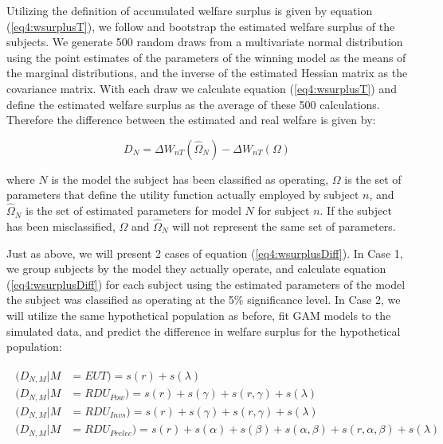 \documentclass[../main.tex]{subfiles}
\begin{document}
Utilizing the definition of accumulated welfare surplus is given by equation (\ref{eq4:wsurplusT}), we follow \textcite[110-111]{Harrison2016} and bootstrap the estimated welfare surplus of the subjects.
We generate 500 random draws from a multivariate normal distribution using the point estimates of the parameters of the winning model as the means of the marginal distributions, and the inverse of the estimated Hessian matrix as the covariance matrix.
With each draw we calculate equation (\ref{eq4:wsurplusT}) and define the estimated welfare surplus as the average of these 500 calculations.
Therefore the difference between the estimated and real welfare is given by:

\begin{equation}
	\label{eq4:wsurplusDiff}
	D_N = \Delta W_{nT}(\hat{\Omega}_N) - \Delta W_{nT}(\Omega)
\end{equation}

\noindent where $N$ is the model the subject has been classified as operating, $\Omega$ is the set of parameters that define the utility function actually employed by subject $n$, and $\hat{\Omega}_N$ is the set of estimated parameters for model $N$ for subject $n$.
If the subject has been misclassified, $\Omega$ and $\hat{\Omega}_N$ will not represent the same set of parameters.

Just as above, we will present 2 cases of equation (\ref{eq4:wsurplusDiff}).
In Case 1, we group subjects by the model they actually operate, and calculate equation (\ref{eq4:wsurplusDiff}) for each subject using the estimated parameters of the model the subject was classified as operating at the 5\% significance level.
In Case 2, we will utilize the same hypothetical population as before, fit GAM models to the simulated data, and predict the difference in welfare surplus for the hypothetical population:

\begin{align}
	\label{eq4:GAM_welfare}
	\begin{split}
		(D_{N,M} | M &= EUT)                   = s(r) + s(\lambda)\\
		(D_{N,M} | M &= \mathit{RDU_{Pow}})    = s(r) + s(\gamma) + s(r, \gamma) + s(\lambda)\\
		(D_{N,M} | M &= \mathit{RDU_{Invs}})   = s(r) + s(\gamma) + s(r, \gamma) + s(\lambda)\\
		(D_{N,M} | M &= \mathit{RDU_{Prelec}}) = s(r) + s(\alpha) + s(\beta) +s(\alpha, \beta) + s(r, \alpha, \beta) + s(\lambda)
	\end{split}
\end{align}
\end{document}
